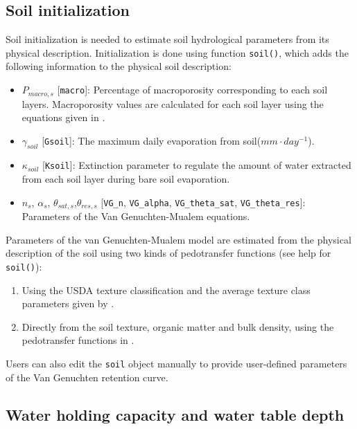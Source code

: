 \documentclass[]{book}
\providecommand{\tightlist}{%
  \setlength{\itemsep}{0pt}\setlength{\parskip}{0pt}}
\begin{document}
\hypertarget{soil-initialization}{%
\subsection{Soil initialization}\label{soil-initialization}}

Soil initialization is needed to estimate soil hydrological parameters from its physical description. Initialization is done using function \texttt{soil()}, which adds the following information to the physical soil description:

\begin{itemize}
\tightlist
\item
  \(P_{macro, s}\) {[}\texttt{macro}{]}: Percentage of macroporosity corresponding to each soil layers. Macroporosity values are calculated for each soil layer using the equations given in \citet{Stolf2011}.
\item
  \(\gamma_{soil}\) {[}\texttt{Gsoil}{]}: The maximum daily evaporation from soil(\(mm \cdot day^{-1}\)).
\item
  \(\kappa_{soil}\) {[}\texttt{Ksoil}{]}: Extinction parameter to regulate the amount of water extracted from each soil layer during bare soil evaporation.
\item
  \(n_{s}\), \(\alpha_{s}\), \(\theta_{sat,s}\),\(\theta_{res,s}\) {[}\texttt{VG\_n}, \texttt{VG\_alpha}, \texttt{VG\_theta\_sat}, \texttt{VG\_theta\_res}{]}: Parameters of the Van Genuchten-Mualem equations.
\end{itemize}

Parameters of the van Genuchten-Mualem model are estimated from the physical description of the soil using two kinds of pedotransfer functions (see help for \texttt{soil()}):

\begin{enumerate}
\def\labelenumi{\arabic{enumi}.}
\tightlist
\item
  Using the USDA texture classification and the average texture class parameters given by \citet{Carsel1988}.
\item
  Directly from the soil texture, organic matter and bulk density, using the pedotransfer functions in \citet{Toth2015}.
\end{enumerate}

Users can also edit the \texttt{soil} object manually to provide user-defined parameters of the Van Genuchten retention curve.

\hypertarget{water-holding-capacity-and-water-table-depth}{%
\subsection{Water holding capacity and water table depth}\label{water-holding-capacity-and-water-table-depth}}
\end{document}
